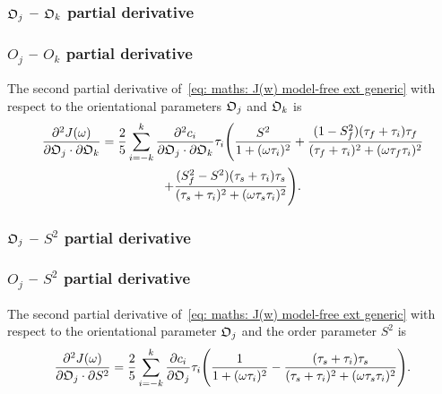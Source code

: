 \begin{latexonly}
    \subsubsection{$\mathfrak{O}_j$ -- $\mathfrak{O}_k$ partial derivative}
\end{latexonly}
\begin{htmlonly}
    \subsubsection{$O_j$ -- $O_k$ partial derivative}
\end{htmlonly}

The second partial derivative of~\eqref{eq: maths: J(w) model-free ext generic} with respect to the orientational parameters $\mathfrak{O}_j$ and $\mathfrak{O}_k$ is
\begin{multline}
    \frac{\partial^2 J(\omega)}{\partial \mathfrak{O}_j \cdot \partial \mathfrak{O}_k} = \frac{2}{5} \sum_{i=-k}^k
        \frac{\partial^2 c_i}{\partial \mathfrak{O}_j \cdot \partial \mathfrak{O}_k} \tau_i \Bigg(
            \frac{S^2}{1 + (\omega \tau_i)^2}
            + \frac{(1 - S^2_f)(\tau_f + \tau_i)\tau_f}{(\tau_f + \tau_i)^2 + (\omega \tau_f \tau_i)^2} \\
            + \frac{(S^2_f - S^2)(\tau_s + \tau_i)\tau_s}{(\tau_s + \tau_i)^2 + (\omega \tau_s \tau_i)^2}
        \Bigg).
\end{multline}



\begin{latexonly}
    \subsubsection{$\mathfrak{O}_j$ -- $S^2$ partial derivative}
\end{latexonly}
\begin{htmlonly}
    \subsubsection{$O_j$ -- $S^2$ partial derivative}
\end{htmlonly}

The second partial derivative of~\eqref{eq: maths: J(w) model-free ext generic} with respect to the orientational parameter $\mathfrak{O}_j$ and the order parameter $S^2$ is
\begin{equation}
    \frac{\partial^2 J(\omega)}{\partial \mathfrak{O}_j \cdot \partial S^2} = \frac{2}{5} \sum_{i=-k}^k \frac{\partial c_i}{\partial \mathfrak{O}_j} \tau_i \Bigg(
        \frac{1}{1 + (\omega \tau_i)^2}
        - \frac{(\tau_s + \tau_i)\tau_s}{(\tau_s + \tau_i)^2 + (\omega \tau_s \tau_i)^2}
    \Bigg).
\end{equation}



